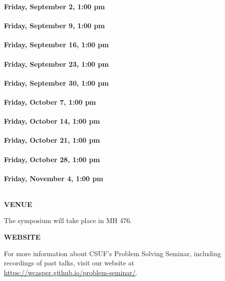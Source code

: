 \documentclass[a4paper]{article}
\begin{document}
\begin{minipage}{0.95\textwidth}
\begin{minipage}[b]{0.47\textwidth}
{\leavevmode \raggedright
\textbf{\color{cprimary}Friday, September 2, 1:00 pm}\\ \\
\textbf{\color{cprimary}Friday, September 9, 1:00 pm}\\ \\
\textbf{\color{cprimary}Friday, September 16, 1:00 pm}\\ \\
\textbf{\color{cprimary}Friday, September 23, 1:00 pm}\\ \\
\textbf{\color{cprimary}Friday, September 30, 1:00 pm}\\ \\
\textbf{\color{cprimary}Friday, October 7, 1:00 pm}\\ \\
\textbf{\color{cprimary}Friday, October 14, 1:00 pm}\\ \\
\textbf{\color{cprimary}Friday, October 21, 1:00 pm}\\ \\
\textbf{\color{cprimary}Friday, October 28, 1:00 pm}\\ \\
\textbf{\color{cprimary}Friday, November 4, 1:00 pm}\\ \\
\par{}
}

\vspace{0.2in}
\medskip

\large{\color{csecondary}\textbf{VENUE}}

The symposium will take place in MH 476.

\medskip

\large{\color{csecondary}\textbf{WEBSITE}}

For more information about CSUF's Problem Solving Seminar, including recordings of past talks, visit our website at\\ \href{https://wcasper.github.io/problem-seminar/}{https://wcasper.github.io/problem-seminar/}.


\end{minipage}
\end{minipage}
\end{document}
